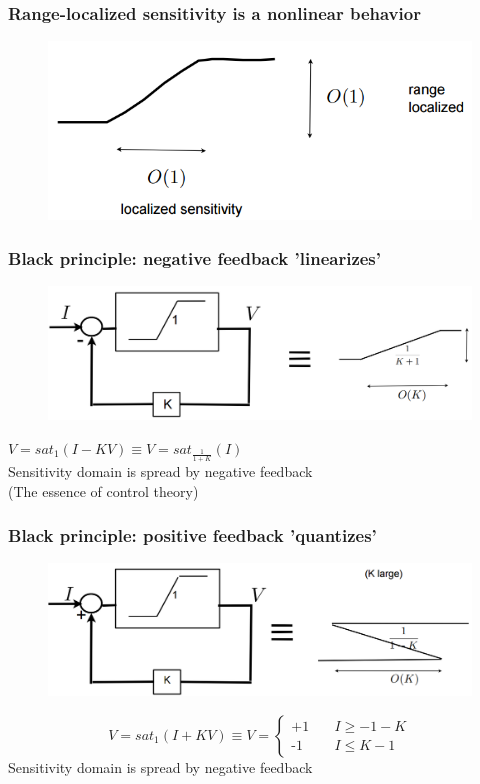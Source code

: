 \documentclass{beamer}
\begin{document}
\begin{frame}
\frametitle{Range-localized sensitivity is a nonlinear behavior}
\begin{figure}
\includegraphics[width=1\linewidth]{range-localization}
\end{figure}
\end{frame}


\begin{frame}
\frametitle{Black principle: negative feedback 'linearizes'}
\begin{figure}
\includegraphics[width=1\linewidth]{black_negative}
\end{figure}
$V = sat_{1}(I - KV) \equiv V = sat_{\frac{1}{1+K}}(I)$\\
Sensitivity domain is spread by negative feedback\\
(The essence of control theory)
\end{frame}


\begin{frame}
\frametitle{Black principle: positive feedback 'quantizes'}
\begin{figure}
\includegraphics[width=1\linewidth]{black_positive}
\end{figure}
\[   
V =  sat_{1}(I + KV) \equiv V =
     \begin{cases}
       \mbox{+1} &\quad \text{$I \geq -1-K$}\\
       \mbox{-1} &\quad \text{$I \leq K-1$}\
     \end{cases}
\]
Sensitivity domain is spread by negative feedback
\end{frame}
\end{document}
